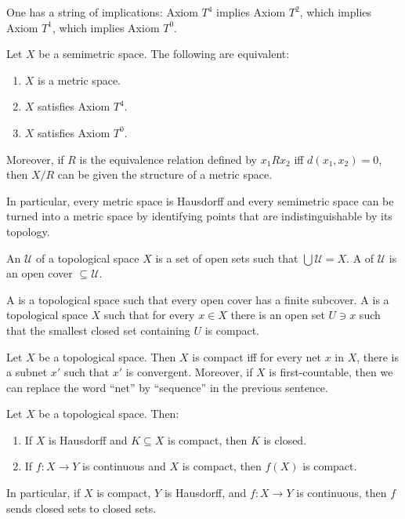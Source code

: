 \begin{lemma}
One has a string of implications: Axiom $T^4$ implies Axiom $T^2$, which implies Axiom $T^1$, which implies Axiom $T^0$.
\end{lemma}

\begin{lemma}
Let $X$ be a semimetric space. The following are equivalent:
\begin{enumerate}
\item $X$ is a metric space.
\item $X$ satisfies Axiom $T^4$.
\item $X$ satisfies Axiom $T^0$.
\end{enumerate}
Moreover, if $R$ is the equivalence relation defined by $x_1 R x_2$ iff $d(x_1, x_2) = 0$, then $X/R$ can be given the structure of a metric space.
\end{lemma}

\begin{subsec}
In particular, every metric space is Hausdorff and every semimetric space can be turned into a metric space by identifying points that are indistinguishable by its topology.
\end{subsec}

\begin{definition}
An  $\mathcal U$ of a topological space $X$ is a set of open sets such that $\bigcup \mathcal U = X$.
A  of $\mathcal U$ is an open cover $\subseteq \mathcal U$.
\end{definition}

\begin{definition}
A  is a topological space such that every open cover has a finite subcover.
A  is a topological space $X$ such that for every $x \in X$ there is an open set $U \ni x$ such that the smallest closed set containing $U$ is compact.
\end{definition}

\begin{lemma}
Let $X$ be a topological space. Then $X$ is compact iff for every net $x$ in $X$, there is a subnet $x'$ such that $x'$ is convergent.
Moreover, if $X$ is first-countable, then we can replace the word ``net'' by ``sequence'' in the previous sentence.
\end{lemma}

\begin{lemma}
Let $X$ be a topological space. Then:
\begin{enumerate}
\item If $X$ is Hausdorff and $K \subseteq X$ is compact, then $K$ is closed.
\item If $f: X \to Y$ is continuous and $X$ is compact, then $f(X)$ is compact.
\end{enumerate}
In particular, if $X$ is compact, $Y$ is Hausdorff, and $f: X \to Y$ is continuous, then $f$ sends closed sets to closed sets.
\end{lemma}

